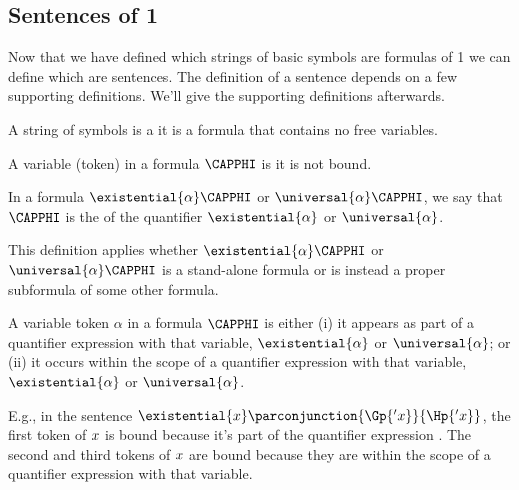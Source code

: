 \subsection{Sentences of \GQL{}1}\label{Sentences of GQL1} 
Now that we have defined which strings of basic symbols are formulas of \GQL{}1 we can define which are sentences. 
The definition of a sentence depends on a few supporting definitions. We'll give the supporting definitions afterwards.
\begin{majorILnc}{}
A string of \GQL{} symbols is a  \Iff it is a formula that contains no free variables.
\end{majorILnc}
\begin{majorILnc}{}
A variable (token) in a formula $\CAPPHI$ is  \Iff it is not bound.
\end{majorILnc}
\begin{majorILnc}{}
	In a formula $\existential{\alpha}\CAPPHI$ or $\universal{\alpha}\CAPPHI$, we say that $\CAPPHI$ is the  of the quantifier $\existential{\alpha}$ or $\universal{\alpha}$. 
\end{majorILnc}
\noindent{}This definition applies whether $\existential{\alpha}\CAPPHI$ or $\universal{\alpha}\CAPPHI$ is a stand-alone formula or is instead a proper subformula of some other formula.
\begin{majorILnc}{}
A variable token $\alpha$ in a formula $\CAPPHI$ is  \Iff either (i) it appears as part of a quantifier expression with that variable, $\existential{\alpha}$ or $\universal{\alpha}$; or (ii) it occurs within the scope of a quantifier expression with that variable, $\existential{\alpha}$ or $\universal{\alpha}$. 
\end{majorILnc}
\noindent{}E.g., in the sentence $\existential{\variable{x}}\parconjunction{\Gp{'\variable{x}}}{\Hp{'\variable{x}}}$, the first token of $x$ is bound because it's part of the quantifier expression .  The second and third tokens of $x$ are bound because they are within the scope of a quantifier expression with that variable.

